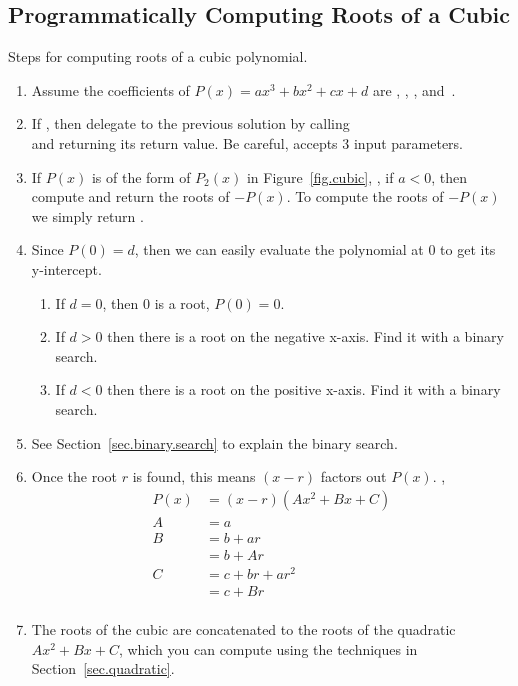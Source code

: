 \subsection{Programmatically Computing Roots of a Cubic}

Steps for computing roots of a cubic polynomial.

\begin{enumerate}
\item Assume the coefficients of $P(x) = a x^3 + b x^2 + c x + d$ are
  ,  ,  ,  and~.
\item If , then delegate to the previous solution by
  calling \\
   and returning its return
  value.  Be careful,  accepts 3 input
  parameters.
\item If $P(x)$ is of the form of $P_2(x)$ in Figure~\ref{fig.cubic},
  \ie, if $a<0$, then compute and return the roots of $-P(x)$.  To
  compute the roots of $-P(x)$ we simply return
  .
\item Since $P(0) = d$, then we can easily evaluate the polynomial at 0 to get its y-intercept.
  \begin{enumerate}
  \item If $d = 0$, then 0 is a root, $P(0) = 0$.
  \item If $d>0$ then there is a root on the negative x-axis.  Find it with a binary search.
  \item If $d<0$ then there is a root on the positive x-axis. Find it with a binary search.
  \end{enumerate}
\item See Section~\ref{sec.binary.search} to explain the binary search.
\item Once the root $r$ is found, this means $(x-r)$ factors out $P(x)$. \Ie,
  \begin{align*}
    P(x) &= (x-r)(A x^2 + B x + C)\\ 
    A &= a\\
    B &= b + a r \\
    &= b + A r\\
    C &= c + b r + a r^2 \\
    &=
    c + B r\\
  \end{align*}
\item The roots of the cubic are \code{[r]} concatenated to the roots of the quadratic 
  $A x^2 + B x + C$, which you can compute using the techniques in Section~\ref{sec.quadratic}.
\end{enumerate}

